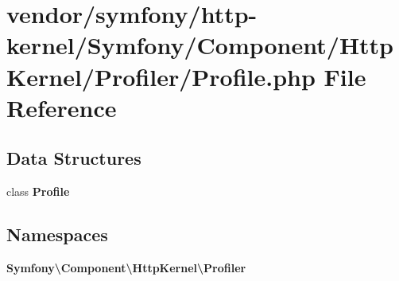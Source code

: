\section{vendor/symfony/http-\/kernel/\+Symfony/\+Component/\+Http\+Kernel/\+Profiler/\+Profile.php File Reference}
\label{_profile_8php}
\subsection*{Data Structures}
\begin{DoxyCompactItemize}
\item 
class {\bf Profile}
\end{DoxyCompactItemize}
\subsection*{Namespaces}
\begin{DoxyCompactItemize}
\item 
 {\bf Symfony\textbackslash{}\+Component\textbackslash{}\+Http\+Kernel\textbackslash{}\+Profiler}
\end{DoxyCompactItemize}
